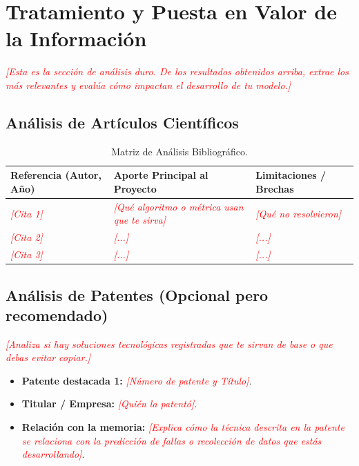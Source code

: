 \documentclass[12pt,a4paper]{article}
\newcommand{\instruccion}[1]{\textcolor{red}{\textit{[#1]}}}
\begin{document}
\section{Tratamiento y Puesta en Valor de la Información}
\instruccion{Esta es la sección de análisis duro. De los resultados obtenidos arriba, extrae los más relevantes y evalúa cómo impactan el desarrollo de tu modelo.}

\subsection{Análisis de Artículos Científicos}

\begin{table}[h]
\centering
\renewcommand{\arraystretch}{1.3}
\begin{tabularx}{\textwidth}{|p{3cm}|X|X|}
\hline
\textbf{Referencia (Autor, Año)} & \textbf{Aporte Principal al Proyecto} & \textbf{Limitaciones / Brechas} \\ \hline
\instruccion{Cita 1} & \instruccion{Qué algoritmo o métrica usan que te sirva} & \instruccion{Qué no resolvieron} \\ \hline
\instruccion{Cita 2} & \instruccion{...} & \instruccion{...} \\ \hline
\instruccion{Cita 3} & \instruccion{...} & \instruccion{...} \\ \hline
\end{tabularx}
\caption{Matriz de Análisis Bibliográfico.}
\label{tab:articulos}
\end{table}

\subsection{Análisis de Patentes (Opcional pero recomendado)}
\instruccion{Analiza si hay soluciones tecnológicas registradas que te sirvan de base o que debas evitar copiar.}

\begin{itemize}
    \item \textbf{Patente destacada 1:} \instruccion{Número de patente y Título}.
    \item \textbf{Titular / Empresa:} \instruccion{Quién la patentó}.
    \item \textbf{Relación con la memoria:} \instruccion{Explica cómo la técnica descrita en la patente se relaciona con la predicción de fallas o recolección de datos que estás desarrollando}.
\end{itemize}
\end{document}
